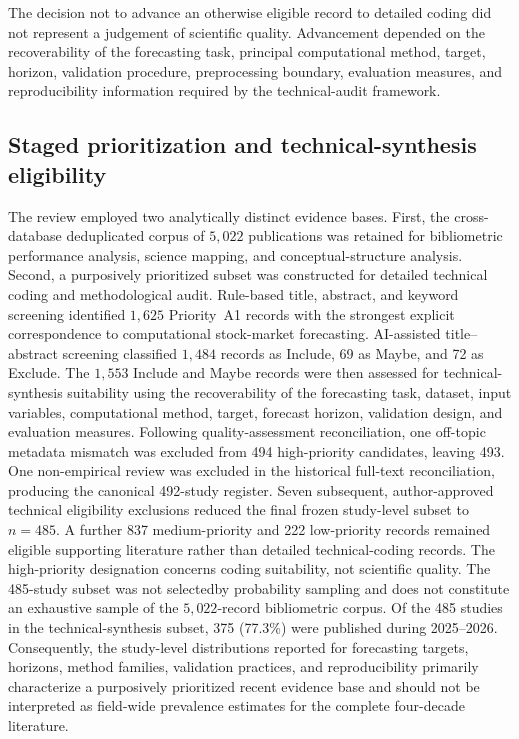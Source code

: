 \documentclass[pdflatex,sn-mathphys-num]{sn-jnl}%
\theoremstyle{thmstyleone}%
\theoremstyle{thmstyletwo}%
\theoremstyle{thmstylethree}%
\begin{document}
The decision not to advance an otherwise eligible record to detailed coding
did not represent a judgement of scientific quality. Advancement depended
on the recoverability of the forecasting task, principal computational
method, target, horizon, validation procedure, preprocessing boundary,
evaluation measures, and reproducibility information required by the
technical-audit framework.

\subsection{Staged prioritization and technical-synthesis eligibility} \label{subsec:staged-prioritization} The review employed two analytically distinct evidence bases. First, the cross-database deduplicated corpus of \(5{,}022\) publications was retained for bibliometric performance analysis, science mapping, and conceptual-structure analysis. Second, a purposively prioritized subset was constructed for detailed technical coding and methodological audit. Rule-based title, abstract, and keyword screening identified \(1{,}625\) Priority~A1 records with the strongest explicit correspondence to computational stock-market forecasting. AI-assisted title--abstract screening classified \(1{,}484\) records as Include, 69 as Maybe, and 72 as Exclude. The \(1{,}553\) Include and Maybe records were then assessed for technical-synthesis suitability using the recoverability of the forecasting task, dataset, input variables, computational method, target, forecast horizon, validation design, and evaluation measures. Following quality-assessment reconciliation, one off-topic
metadata mismatch was excluded from 494 high-priority candidates,
leaving 493. One non-empirical review was excluded in the historical
full-text reconciliation, producing the canonical 492-study register.
Seven subsequent, author-approved technical eligibility exclusions
reduced the final frozen study-level subset to $n=485$.
A further 837 medium-priority and 222 low-priority records remained
eligible supporting literature rather than detailed technical-coding
records. The high-priority designation concerns coding suitability,
not scientific quality. The 485-study subset was not selectedby probability sampling
and does not constitute an exhaustive sample of the
\(5{,}022\)-record bibliometric corpus. Of the 485 studies in the technical-synthesis subset,
375 (77.3\%) were published during 2025--2026.
Consequently, the study-level distributions reported for forecasting
targets, horizons, method families, validation practices, and
reproducibility primarily characterize a purposively prioritized
recent evidence base and should not be interpreted as field-wide
prevalence estimates for the complete four-decade literature.
\end{document}
